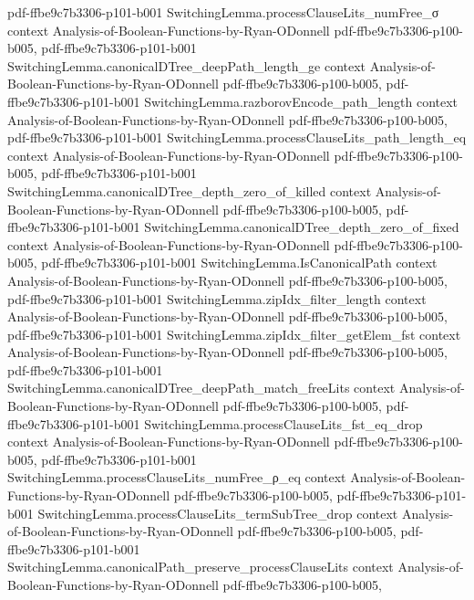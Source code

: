 \begin{lemma}
{    pdf-ffbe9c7b3306-p101-b001}
\proofstep
  {SwitchingLemma.processClauseLits_numFree_σ}
  {context}
  {Analysis-of-Boolean-Functions-by-Ryan-ODonnell}
  {pdf-ffbe9c7b3306-p100-b005,
    pdf-ffbe9c7b3306-p101-b001}
\proofstep
  {SwitchingLemma.canonicalDTree_deepPath_length_ge}
  {context}
  {Analysis-of-Boolean-Functions-by-Ryan-ODonnell}
  {pdf-ffbe9c7b3306-p100-b005,
    pdf-ffbe9c7b3306-p101-b001}
\proofstep
  {SwitchingLemma.razborovEncode_path_length}
  {context}
  {Analysis-of-Boolean-Functions-by-Ryan-ODonnell}
  {pdf-ffbe9c7b3306-p100-b005,
    pdf-ffbe9c7b3306-p101-b001}
\proofstep
  {SwitchingLemma.processClauseLits_path_length_eq}
  {context}
  {Analysis-of-Boolean-Functions-by-Ryan-ODonnell}
  {pdf-ffbe9c7b3306-p100-b005,
    pdf-ffbe9c7b3306-p101-b001}
\proofstep
  {SwitchingLemma.canonicalDTree_depth_zero_of_killed}
  {context}
  {Analysis-of-Boolean-Functions-by-Ryan-ODonnell}
  {pdf-ffbe9c7b3306-p100-b005,
    pdf-ffbe9c7b3306-p101-b001}
\proofstep
  {SwitchingLemma.canonicalDTree_depth_zero_of_fixed}
  {context}
  {Analysis-of-Boolean-Functions-by-Ryan-ODonnell}
  {pdf-ffbe9c7b3306-p100-b005,
    pdf-ffbe9c7b3306-p101-b001}
\proofstep
  {SwitchingLemma.IsCanonicalPath}
  {context}
  {Analysis-of-Boolean-Functions-by-Ryan-ODonnell}
  {pdf-ffbe9c7b3306-p100-b005,
    pdf-ffbe9c7b3306-p101-b001}
\proofstep
  {SwitchingLemma.zipIdx_filter_length}
  {context}
  {Analysis-of-Boolean-Functions-by-Ryan-ODonnell}
  {pdf-ffbe9c7b3306-p100-b005,
    pdf-ffbe9c7b3306-p101-b001}
\proofstep
  {SwitchingLemma.zipIdx_filter_getElem_fst}
  {context}
  {Analysis-of-Boolean-Functions-by-Ryan-ODonnell}
  {pdf-ffbe9c7b3306-p100-b005,
    pdf-ffbe9c7b3306-p101-b001}
\proofstep
  {SwitchingLemma.canonicalDTree_deepPath_match_freeLits}
  {context}
  {Analysis-of-Boolean-Functions-by-Ryan-ODonnell}
  {pdf-ffbe9c7b3306-p100-b005,
    pdf-ffbe9c7b3306-p101-b001}
\proofstep
  {SwitchingLemma.processClauseLits_fst_eq_drop}
  {context}
  {Analysis-of-Boolean-Functions-by-Ryan-ODonnell}
  {pdf-ffbe9c7b3306-p100-b005,
    pdf-ffbe9c7b3306-p101-b001}
\proofstep
  {SwitchingLemma.processClauseLits_numFree_ρ_eq}
  {context}
  {Analysis-of-Boolean-Functions-by-Ryan-ODonnell}
  {pdf-ffbe9c7b3306-p100-b005,
    pdf-ffbe9c7b3306-p101-b001}
\proofstep
  {SwitchingLemma.processClauseLits_termSubTree_drop}
  {context}
  {Analysis-of-Boolean-Functions-by-Ryan-ODonnell}
  {pdf-ffbe9c7b3306-p100-b005,
    pdf-ffbe9c7b3306-p101-b001}
\proofstep
  {SwitchingLemma.canonicalPath_preserve_processClauseLits}
  {context}
  {Analysis-of-Boolean-Functions-by-Ryan-ODonnell}
  {pdf-ffbe9c7b3306-p100-b005,
}
\end{lemma}
